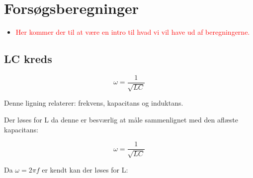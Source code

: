\chapter{Forsøgsberegninger}

\begin{itemize}
\item \textcolor{red}{Her kommer der til at være en intro til hvad vi vil have ud af beregningerne.}
\end{itemize}

\section{LC kreds}

\begin{equation} \label{angfreq}
	\omega = \frac{1}{\sqrt{LC}}
\end{equation}

Denne ligning relaterer: frekvens, kapacitans og induktans.

Der løses for L da denne er besværlig at måle sammenlignet med den aflæste kapacitans:

\begin{equation}
	\omega = \frac{1}{\sqrt{LC}} 
\end{equation}

Da $\omega = 2\pi f$ er kendt kan der løses for L:
